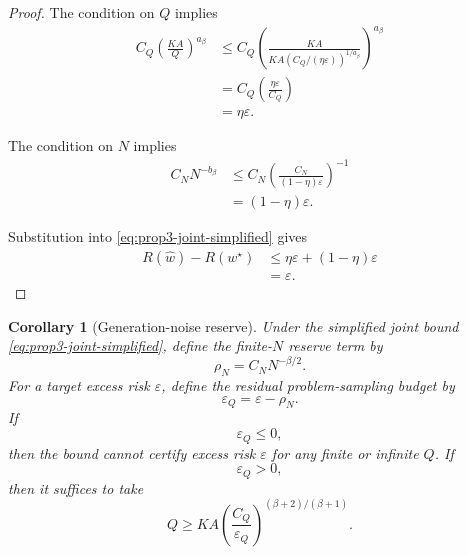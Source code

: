 \documentclass{article} %
\newtheorem{corollary}[theorem]{Corollary}
\providecommand{\Risk}{R}
\providecommand{\what}{\widehat{w}}
\providecommand{\wstar}{w^{\star}}
\begin{document}
\begin{proof}
The condition on \(Q\) implies
\begin{align}
C_Q\left(\frac{KA}{Q}\right)^{a_\beta}
&\le
C_Q
\left(
\frac{KA}{
KA(C_Q/(\eta\varepsilon))^{1/a_\beta}
}
\right)^{a_\beta}
\label{eq:prop3-proof-Q-a}
\\
&=
C_Q
\left(
\frac{\eta\varepsilon}{C_Q}
\right)
\label{eq:prop3-proof-Q-b}
\\
&=
\eta\varepsilon .
\label{eq:prop3-proof-Q-c}
\end{align}

The condition on \(N\) implies
\begin{align}
C_NN^{-b_\beta}
&\le
C_N
\left(
\frac{C_N}{(1-\eta)\varepsilon}
\right)^{-1}
\label{eq:prop3-proof-N-a}
\\
&=
(1-\eta)\varepsilon .
\label{eq:prop3-proof-N-b}
\end{align}

Substitution into \eqref{eq:prop3-joint-simplified} gives
\begin{align}
\Risk(\what)-\Risk(\wstar)
&\le
\eta\varepsilon+(1-\eta)\varepsilon
\label{eq:prop3-proof-sum-a}
\\
&=
\varepsilon .
\label{eq:prop3-proof-sum-b}
\end{align}
\end{proof}

\begin{corollary}[Generation-noise reserve]
\label{cor:app3-reserve}
Under the simplified joint bound \eqref{eq:prop3-joint-simplified}, define the
finite-\(N\) reserve term by
\begin{equation}
\label{eq:reserve-rho}
\rho_N
=
C_NN^{-\beta/2}.
\end{equation}
For a target excess risk \(\varepsilon\), define the residual problem-sampling
budget by
\begin{equation}
\label{eq:reserve-residual}
\varepsilon_Q
=
\varepsilon-\rho_N.
\end{equation}
If
\begin{equation}
\label{eq:reserve-negative}
\varepsilon_Q\le 0,
\end{equation}
then the bound cannot certify excess risk \(\varepsilon\) for any finite or
infinite \(Q\).  If
\begin{equation}
\label{eq:reserve-positive}
\varepsilon_Q>0,
\end{equation}
then it suffices to take
\begin{equation}
\label{eq:reserve-Q}
Q
\ge
KA
\left(\frac{C_Q}{\varepsilon_Q}\right)^{(\beta+2)/(\beta+1)} .
\end{equation}
\end{corollary}
\end{document}
